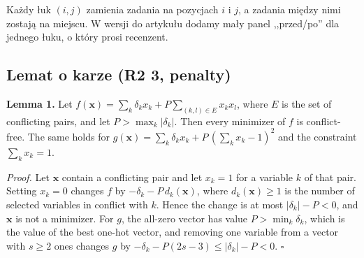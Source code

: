 \documentclass[11pt,a4paper]{article}
\begin{document}
\begin{center}
\end{center}
Każdy łuk $(i,j)$ zamienia zadania na pozycjach $i$ i $j$, a zadania między nimi zostają na miejscu. W wersji do artykułu dodamy mały panel ,,przed/po'' dla jednego łuku, o który prosi recenzent.

\subsection{Lemat o karze (R2 3, penalty)}\label{sec:lemat}

\begin{pozmianie}
\textbf{Lemma 1.} Let $f(\mathbf{x})=\sum_{k}\delta_k x_k+P\sum_{(k,l)\in E}x_kx_l$, where $E$ is the set of conflicting pairs, and let $P>\max_k|\delta_k|$. Then every minimizer of $f$ is conflict-free. The same holds for $g(\mathbf{x})=\sum_k\delta_kx_k+P\,(\sum_kx_k-1)^2$ and the constraint $\sum_k x_k=1$.

\emph{Proof.} Let $\mathbf{x}$ contain a conflicting pair and let $x_k=1$ for a variable $k$ of that pair. Setting $x_k=0$ changes $f$ by $-\delta_k-P\,d_k(\mathbf{x})$, where $d_k(\mathbf{x})\ge 1$ is the number of selected variables in conflict with $k$. Hence the change is at most $|\delta_k|-P<0$, and $\mathbf{x}$ is not a minimizer. For $g$, the all-zero vector has value $P>\min_k\delta_k$, which is the value of the best one-hot vector, and removing one variable from a vector with $s\ge 2$ ones changes $g$ by $-\delta_k-P(2s-3)\le|\delta_k|-P<0$. $\square$
\end{pozmianie}
\end{document}
